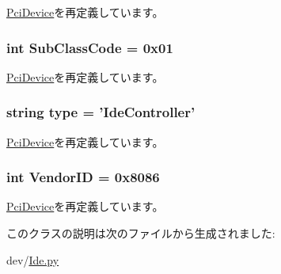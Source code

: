 \hyperlink{classPci_1_1PciDevice_aba3540dcad58fc3d3042791b42b96b98}{PciDevice}を再定義しています。\hypertarget{classIde_1_1IdeController_a6537e94b8ab06acd357673ec1699adc8}{
\subsubsection[{SubClassCode}]{\setlength{\rightskip}{0pt plus 5cm}int {\bf SubClassCode} = 0x01}}
\label{classIde_1_1IdeController_a6537e94b8ab06acd357673ec1699adc8}


\hyperlink{classPci_1_1PciDevice_aa5dab65525a81097713cebf095217409}{PciDevice}を再定義しています。\hypertarget{classIde_1_1IdeController_acce15679d830831b0bbe8ebc2a60b2ca}{
\subsubsection[{type}]{\setlength{\rightskip}{0pt plus 5cm}string {\bf type} = '{\bf IdeController}'}}
\label{classIde_1_1IdeController_acce15679d830831b0bbe8ebc2a60b2ca}


\hyperlink{classPci_1_1PciDevice_acce15679d830831b0bbe8ebc2a60b2ca}{PciDevice}を再定義しています。\hypertarget{classIde_1_1IdeController_a96ec1b4422f12f72160a0633ada47217}{
\subsubsection[{VendorID}]{\setlength{\rightskip}{0pt plus 5cm}int {\bf VendorID} = 0x8086}}
\label{classIde_1_1IdeController_a96ec1b4422f12f72160a0633ada47217}


\hyperlink{classPci_1_1PciDevice_a48f611c5f9d4755971b7c867e4529cc6}{PciDevice}を再定義しています。

このクラスの説明は次のファイルから生成されました:\begin{DoxyCompactItemize}
\item 
dev/\hyperlink{Ide_8py}{Ide.py}\end{DoxyCompactItemize}
